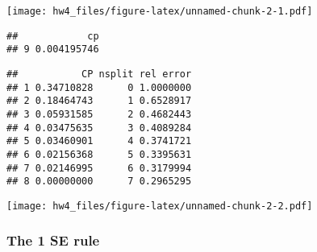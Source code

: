 \documentclass[
]{article}
\newenvironment{Shaded}{\begin{snugshade}}{\end{snugshade}}
\newcommand{\FunctionTok}[1]{\textcolor[rgb]{0.00,0.00,0.00}{#1}}
\newcommand{\NormalTok}[1]{#1}
\newcommand{\SpecialCharTok}[1]{\textcolor[rgb]{0.00,0.00,0.00}{#1}}
\begin{document}
\texttt{[image: hw4\_files/figure-latex/unnamed-chunk-2-1.pdf]}

\begin{Shaded}
\end{Shaded}

\begin{verbatim}
##            cp
## 9 0.004195746
\end{verbatim}

\begin{Shaded}
\end{Shaded}

\begin{verbatim}
##           CP nsplit rel error
## 1 0.34710828      0 1.0000000
## 2 0.18464743      1 0.6528917
## 3 0.05931585      2 0.4682443
## 4 0.03475635      3 0.4089284
## 5 0.03460901      4 0.3741721
## 6 0.02156368      5 0.3395631
## 7 0.02146995      6 0.3179994
## 8 0.00000000      7 0.2965295
\end{verbatim}

\begin{Shaded}
\end{Shaded}

\texttt{[image: hw4\_files/figure-latex/unnamed-chunk-2-2.pdf]}

\hypertarget{the-1-se-rule}{%
\subsubsection{The 1 SE rule}\label{the-1-se-rule}}
\end{document}
